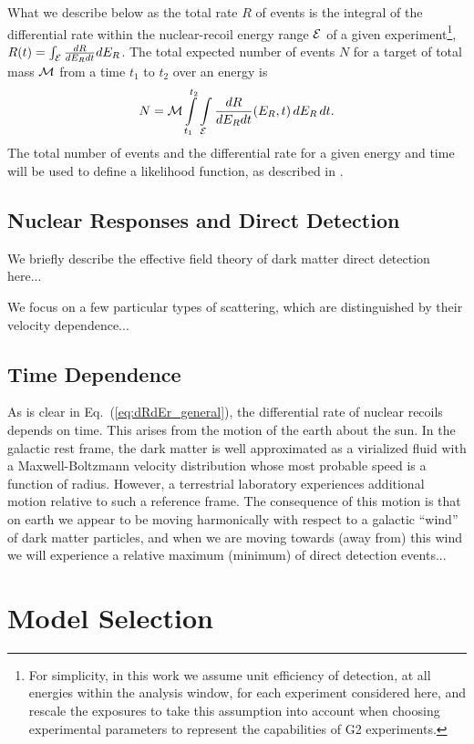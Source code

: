 \documentclass[11pt]{article}
\newcommand{\beq}{\begin{equation}} \newcommand{\eeq}{\end{equation}}
\newcommand{\Eq}[1]{Eq.~(\ref{#1})} \newcommand{\Eqs}[2]{Eqs.~(\ref{#1}) and (\ref{#2})} \newcommand{\Eqm}[2]{Eqs.~(\ref{#1}) through (\ref{#2})}
\begin{document}
What we describe below as the total rate $R$ of events is the integral of the differential rate within the nuclear-recoil energy range ${\cal E}$ of a given experiment\footnote{For simplicity, in this work we assume unit efficiency of detection, at all energies within the analysis window, for each experiment considered here, and rescale the exposures to take this assumption into account when choosing experimental parameters to represent the capabilities of G2 experiments.}, $R(t)=\int_{\cal E} \frac{dR}{dE_R dt} dE_R$. The total expected number of events $N$ for a target of total mass ${\cal M}$ from a time $t_1$ to $t_2$ over an energy is 
\beq
N =  \cM \int\limits_{t_1}^{t_2} \int\limits_\cE  \frac{dR}{dE_R dt}(E_R,t)\,dE_R \,dt.
\eeq
The total number of events and the differential rate for a given energy and time will be used to define a likelihood function, as described in \cite{Gluscevic:2015sqa}.

\subsection{Nuclear Responses and Direct Detection}

We briefly describe the effective field theory of dark matter direct detection here...

We focus on a few particular types of scattering, which are distinguished by their velocity dependence...

\subsection{Time Dependence}

As is clear in \Eq{eq:dRdEr_general}, the differential rate of nuclear recoils depends on time. This arises from the motion of the earth about the sun. In the galactic rest frame, the dark matter is well approximated as a virialized fluid with a Maxwell-Boltzmann velocity distribution whose most probable speed is a function of radius. However, a terrestrial laboratory experiences additional motion relative to such a reference frame. The consequence of this motion is that on earth we appear to be moving harmonically with respect to a galactic ``wind'' of dark matter particles, and when we are moving towards (away from) this wind we will experience a relative maximum (minimum) of direct detection events...


\section{Model Selection}
\end{document}
